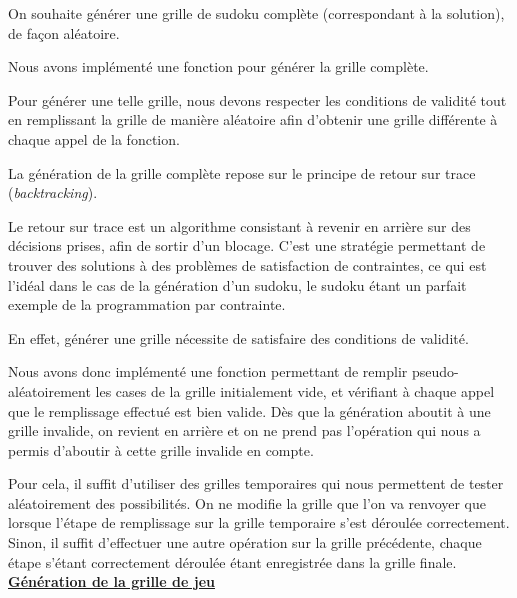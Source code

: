 \documentclass[a4paper, 12pt]{article}
\begin{document}
	\par On souhaite générer une grille de sudoku complète (correspondant à la solution), de façon aléatoire.
	\par Nous avons implémenté une fonction pour générer la grille complète.
	\par Pour générer une telle grille, nous devons respecter les conditions de validité tout en remplissant la grille de manière aléatoire afin d'obtenir une grille différente à chaque appel de la fonction.
	\par La génération de la grille complète repose sur le principe de retour sur trace (\textit{backtracking}).
	\par Le retour sur trace est un algorithme consistant à revenir en arrière sur des décisions prises, afin de sortir d'un blocage. C'est une stratégie permettant de trouver des solutions à des problèmes de satisfaction de contraintes, ce qui est l'idéal dans le cas de la génération d'un sudoku, le sudoku étant un parfait exemple de la programmation par contrainte.
	\par En effet, générer une grille nécessite de satisfaire des conditions de validité.
	\par Nous avons donc implémenté une fonction permettant de remplir pseudo-aléatoirement les cases de la grille initialement vide, et vérifiant à chaque appel que le remplissage effectué est bien valide. Dès que la génération aboutit à une grille invalide, on revient en arrière et on ne prend pas l'opération qui nous a permis d'aboutir à cette grille invalide en compte.
	\par Pour cela, il suffit d'utiliser des grilles temporaires qui nous permettent de tester aléatoirement des possibilités. On ne modifie la grille que l'on va renvoyer que lorsque l'étape de remplissage sur la grille temporaire s'est déroulée correctement. Sinon, il suffit d'effectuer une autre opération sur la grille précédente, chaque étape s'étant correctement déroulée étant enregistrée dans la grille finale.\\

\underline{\textbf{Génération de la grille de jeu}}
\end{document}

